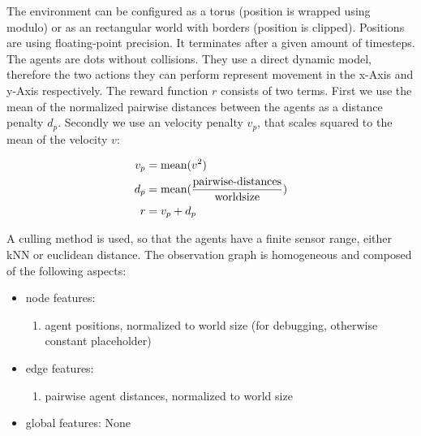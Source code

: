 The environment can be configured as a torus (position is wrapped using modulo) or as an rectangular world with borders (position is clipped). Positions are using floating-point precision. It terminates after a given amount of timesteps.
The agents are dots without collisions. They use a direct dynamic model, therefore the two actions they can perform represent movement in the x-Axis and y-Axis respectively.
The reward function $r$ consists of two terms. First we use the mean of the normalized pairwise distances between the agents as a distance penalty $d_p$. Secondly we use an velocity penalty $v_p$, that scales squared to the mean of the velocity $v$:

\begin{equation}
    \begin{aligned}
        v_p &= \textup{mean}(v^2)\\
        d_p &= \textup{mean}(\frac{\textup{pairwise-distances}}{\textup{worldsize}}) \\
        r &= v_p + d_p
    \end{aligned}
    \nonumber
\end{equation}

A culling method is used, so that the agents have a finite sensor range, either kNN or euclidean distance. The observation graph is homogeneous and composed of the following aspects:

\begin{itemize}[noitemsep,nolistsep]
    \item node features:
    \begin{enumerate}
        \item agent positions, normalized to world size (for debugging, otherwise constant placeholder)
    \end{enumerate} 
    \item edge features:
    \begin{enumerate}
        \item pairwise agent distances, normalized to world size
    \end{enumerate} 
    \item global features: None
\end{itemize}



